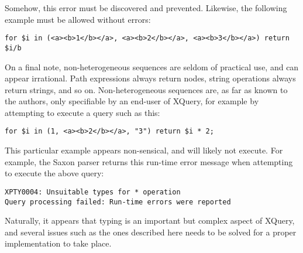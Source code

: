 Somehow, this error must be discovered and prevented. Likewise, the following
example must be allowed without errors:

\begin{Verbatim}
for $i in (<a><b>1</b></a>, <a><b>2</b></a>, <a><b>3</b></a>) return $i/b
\end{Verbatim}

On a final note, non-heterogeneous sequences are seldom of practical use, and
can appear irrational. Path expressions always return nodes, string operations
always return strings, and so on. Non-heterogeneous sequences are, as far as
known to the authors, only specifiable by an end-user of XQuery, for example by
attempting to execute a query such as this:

\begin{Verbatim}
for $i in (1, <a><b>2</b></a>, "3") return $i * 2;
\end{Verbatim}

This particular example appears non-sensical, and will likely not execute. For
example, the Saxon parser returns this run-time error message when attempting
to execute the above query:

\begin{Verbatim}
XPTY0004: Unsuitable types for * operation
Query processing failed: Run-time errors were reported
\end{Verbatim}

Naturally, it appears that typing is an important but complex aspect of XQuery,
and several issues such as the ones described here needs to be solved for a
proper implementation to take place.


